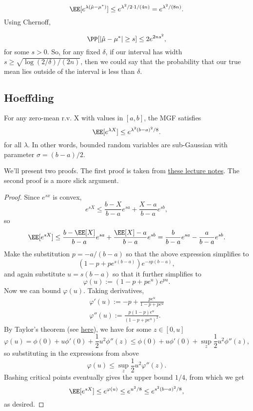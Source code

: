 \[\EE[e^{\lambda(\hat{\mu}-\mu^*)}] \leq e^{\lambda^2/2\cdot 1/(4n)} = e^{\lambda^2/(8n)}.\]
Using Chernoff,

\[\PP[\vert \hat{\mu}-\mu^*\vert \geq s] \leq 2e^{2ns^2},\] 
for some $s > 0$. So, for any fixed $\delta$, if our interval has width $s \geq \sqrt{\log(2/\delta) / (2n)}$, then we could say that the probability that our true mean lies outside of the interval is less than $\delta$.

\subsection{Hoeffding}

\begin{theorem}

For any zero-mean r.v. X with values in $[a,b]$, the MGF satisfies 
\[\EE[e^{\lambda X}] \leq e^{\lambda^2 (b-a)^2 / 8}.\]
for all $\lambda$. In other words, bounded random variables are sub-Gaussian with parameter $\sigma=(b-a)/2$.
\end{theorem}
We'll present two proofs. The first proof is taken from \href{https://courses.cs.washington.edu/courses/cse521/21au/521-lecture-3.pdf}{these lecture notes}. The second proof is a more slick argument. 

\begin{proof}
Since $e^{sx}$ is convex, 
\[e^{sX}\leq \frac{b-X}{b-a}e^{sa} + \frac{X-a}{b-a}e^{sb},\] 
so 
\[\EE[e^{sX}]\leq \frac{b-\EE[X]}{b-a}e^{sa} + \frac{\EE[X]-a}{b-a}e^{sb} = \frac{b}{b-a}e^{sa}-\frac{a}{b-a}e^{sb}.\] 
Make the substitution $p = -a/(b-a)$ so that the above expression simplifies to
\[(1-p+pe^{s(b-a)})e^{-sp(b-a)},\] 
and again substitute $u=s(b-a)$ so that it further simplifies to
\[\varphi(u) := (1-p+pe^u)e^{pu}.\]
Now we can bound $\varphi(u)$. Taking derivatives, 
\begin{align*}
	\varphi'(u) := -p+\frac{pe^u}{1-p+pe^u} \\
	\varphi''(u) := \frac{p(1-p)e^u}{(1-p+pe^u)^2}. 
\end{align*}
By Taylor's theorem (see \href{https://math.stackexchange.com/questions/3238111/application-of-taylors-theorem-find-upper-bound-for-remainder}{here}), we have for some $z\in [0,u]$
\[\varphi(u) = \phi(0) + u\phi'(0) + \frac{1}{2}u^2\phi''(z)\leq \phi(0) + u\phi'(0) + \sup_z \frac{1}{2}u^2\phi''(z),\]
so substituting in the expressions from above 
\[\varphi(u) \leq \sup_z \frac{1}{2}u^2 \varphi''(z).\] 
Bashing critical points eventually gives the upper bound $1/4$, from which we get 
\[\EE[e^{sX}]\leq e^{\varphi(u)} \leq e^{u^2/8} \leq e^{s^2(b-a)^2/8},\]
as desired.
\end{proof}

